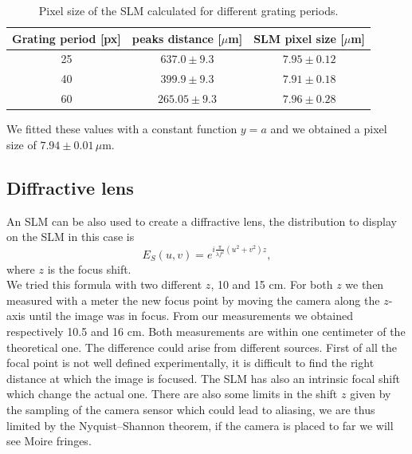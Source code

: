 \documentclass[a4paper,10pt]{article}
\begin{document}
\begin{table}[H]
\centering
\begin{tabular}{c|c|c}
 Grating period [px]& peaks distance [$\mu$m] & SLM pixel size [$\mu$m] \\
  \hline
  25 & $637.0\pm9.3$ & $7.95\pm0.12$ \\
  \hline
  40 & $399.9\pm 9.3$ & $7.91 \pm 0.18$ \\
  \hline
  60 & $265.05\pm 9.3 $ & $7.96 \pm 0.28$ \\
  \hline
\end{tabular}
\caption{Pixel size of the SLM calculated for different grating periods.}
\end{table}
We fitted these values with a constant function $y=a$ and we obtained a pixel size of $7.94\pm 0.01\,\mu$m.
\subsection{Diffractive lens}
An SLM can be also used to create a diffractive lens, the distribution to display on the SLM in this case is \cite{skriptum}
\begin{equation}E_S(u,v) = e^{i\frac{\pi}{\lambda f^2}(u^2+v^2)z},\end{equation}
where $z$ is the focus shift. \\
We tried this formula with two different $z$, 10 and 15 cm. For both $z$ we then measured with a meter the new focus point by moving the camera along the $z$-axis until the image was in focus. From our measurements we obtained respectively 10.5 and 16 cm. Both measurements are within one centimeter of the theoretical one. The difference could arise from different sources. First of all the focal point is not well defined experimentally, it is difficult to find the right distance at which the image is focused. The SLM has also an intrinsic focal shift which change the actual one. There are also some limits in the shift $z$ given by the sampling of the camera sensor which could lead to aliasing, we are thus limited by the Nyquist–Shannon theorem, if the camera is placed to far we will see Moire fringes.
\end{document}
